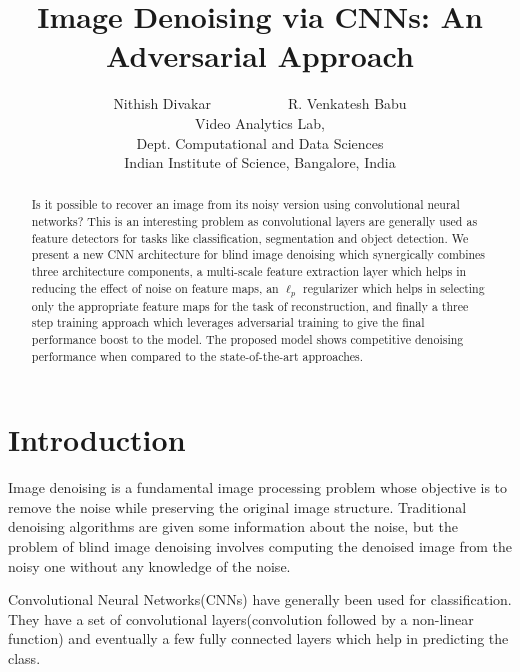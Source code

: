 \documentclass[10pt,twocolumn,letterpaper]{proc}
\begin{document}
\title{Image Denoising via CNNs: An Adversarial Approach}

\author{Nithish Divakar~~~~~~~~~~~R. Venkatesh Babu\\
Video Analytics Lab,\\
Dept. Computational and Data Sciences\\
Indian Institute of Science, Bangalore, India\\
}


\maketitle
\begin{abstract}
Is it possible to recover an image from its noisy version using convolutional neural networks?
This is an interesting problem as convolutional layers are generally used as feature detectors for tasks like classification, segmentation and object detection.
We present a new CNN architecture for blind image denoising which synergically  combines three architecture components,
a multi-scale feature extraction layer which helps in reducing the effect of noise on feature maps, an $\ell_p$ regularizer which helps in selecting only the appropriate feature maps for the task of reconstruction, and finally a three step training approach which leverages adversarial training to give the final performance boost to the model.
The proposed model shows competitive denoising performance when compared to the state-of-the-art approaches.
\end{abstract}

\section{Introduction}\label{sec:intro}

Image denoising is a fundamental image processing problem whose objective is to remove the noise while preserving the original image structure. 
%
%
Traditional denoising algorithms are given some information about the noise, but the problem of blind image denoising involves computing the denoised image from the noisy one without any knowledge of the noise.




Convolutional Neural Networks(CNNs) have generally been used for classification.
They have a set of convolutional layers(convolution followed by a non-linear function) and eventually a few fully connected layers which help in predicting the class.
\end{document}

